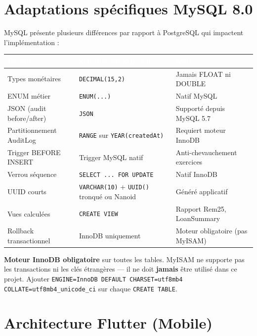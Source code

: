 \documentclass[12pt, a4paper]{report}
\begin{document}
\section{Adaptations spécifiques MySQL 8.0}

MySQL présente plusieurs différences par rapport à PostgreSQL qui impactent l'implémentation :

\begin{center}
\small
{}
\begin{tabular}{L{3.5cm}L{4.5cm}L{5cm}}
  \toprule
  \textcolor{white}{\textbf{Besoin}} &
  \textcolor{white}{\textbf{Solution MySQL 8.0}} &
  \textcolor{white}{\textbf{Note}} \\
  \midrule
  Types monétaires        & \texttt{DECIMAL(15,2)}     & Jamais FLOAT ni DOUBLE \\
  ENUM métier             & \texttt{ENUM(...)}          & Natif MySQL \\
  JSON (audit before/after)& \texttt{JSON}              & Supporté depuis MySQL 5.7 \\
  Partitionnement AuditLog & \texttt{RANGE} sur \texttt{YEAR(createdAt)} & Requiert moteur InnoDB \\
  Trigger BEFORE INSERT   & Trigger MySQL natif         & Anti-chevauchement exercices \\
  Verrou séquence         & \texttt{SELECT ... FOR UPDATE} & Natif InnoDB \\
  UUID courts             & \texttt{VARCHAR(10)} + \texttt{UUID()} tronqué ou Nanoid & Généré applicatif \\
  Vues calculées          & \texttt{CREATE VIEW}        & Rapport Rem25, LoanSummary \\
  Rollback transactionnel & InnoDB uniquement           & Moteur obligatoire (pas MyISAM) \\
  \bottomrule
\end{tabular}
\end{center}

\begin{warningBox}
  \textbf{Moteur InnoDB obligatoire} sur toutes les tables. MyISAM ne supporte pas les transactions
  ni les clés étrangères — il ne doit \textbf{jamais} être utilisé dans ce projet.
  Ajouter \texttt{ENGINE=InnoDB DEFAULT CHARSET=utf8mb4 COLLATE=utf8mb4\_unicode\_ci}
  sur chaque \texttt{CREATE TABLE}.
\end{warningBox}

\section{Architecture Flutter (Mobile)}
\end{document}
